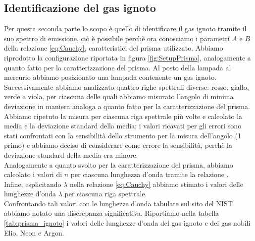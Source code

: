 \documentclass[letterpaper,12pt]{article}
\begin{document}
\subsection{Identificazione del gas ignoto}
Per questa seconda parte lo scopo è quello di identificare il gas ignoto tramite il suo spettro di emissione, ciò è possibile 
perchè ora conosciamo  i parametri $A$ e $B$ della relazione \ref{eq:Cauchy}, caratteristici del prisma utilizzato.
Abbiamo riprodotto la configurazione riportata in figura \ref{fig:SetupPrisma}, analogamente a quanto fatto per la 
caratterizzazione del prisma. Al posto della lampada al mercurio abbiamo posizionato una lampada contenente un gas
ignoto.
Successivamente abbiamo analizzato quattro righe spettrali diverse: rosso, giallo, verde e viola, per ciascuna delle quali abbiamo
misurato l'angolo di minima deviazione in maniera analoga a quanto fatto per la caratterizzazione del prisma. Abbiamo 
ripetuto la misura per ciascuna riga spettrale più volte e calcolato la media e la deviazione standard della media; i
valori ricavati per gli errori sono stati confrontati con la sensibilità dello strumento per la misura dell'angolo (1 primo) e abbiamo deciso di
considerare come errore la sensibilità, perchè la deviazione standard della media era minore. \\
Analogamente a quanto svolto per la caratterizzazione del prisma, abbiamo calcolato i valori di $n$ per ciascuna
lunghezza d'onda tramite la relazione .\\
Infine, esplicitando
$\lambda$ nella relazione \ref{eq:Cauchy} abbiamo stimato i valori delle lunghezze d'onda $\lambda$ per ciascuna riga spettrale. \\
Confrontando tali valori con le lunghezze d'onda tabulate sul sito del NIST abbiamo notato una discrepanza significativa.
Riportiamo nella tabella \ref{tab:prisma_ignoto} i valori delle lunghezze d'onda del gas ignoto e dei gas nobili Elio, Neon e Argon.
\end{document}
